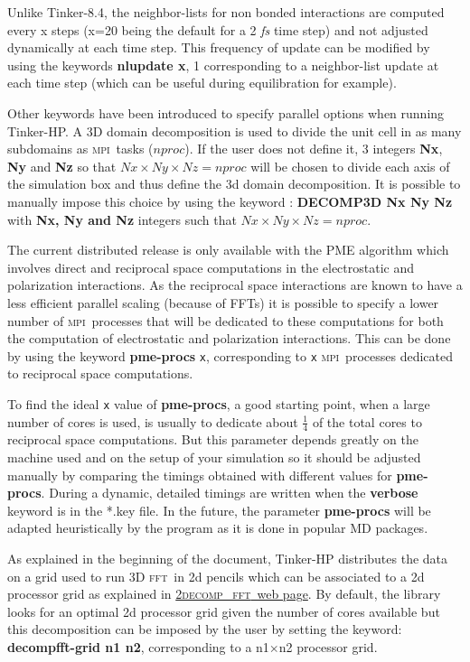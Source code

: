 \documentclass[peerreview]{IEEEtran}
\def\fft{\textsc{fft}}
\def\mpi{\textsc{mpi}}
\def\decomp{\textsc{2decomp\_fft}}
\begin{document}
\vskip5mm
Unlike Tinker-8.4, the neighbor-lists for non bonded interactions are computed every x steps (x=20 being the default for a 2 {\em fs} time step) and not adjusted dynamically at each time step. This frequency of update can be modified by using the keywords \textbf{nlupdate x}, 1 corresponding to a neighbor-list update at each time step (which can be useful during equilibration for example).

\vskip5mm
Other keywords have been introduced to specify parallel options when running Tinker-HP.
A 3D domain decomposition is used to divide the unit cell in as many subdomains as \mpi\ tasks ($nproc$). If the user does not define it, 3 integers \textbf{Nx}, \textbf{Ny} and \textbf{Nz} so that $Nx\times Ny\times Nz = nproc$ will be chosen to divide each axis of the simulation box and thus define the 3d domain decomposition. 
It is possible to manually impose this choice by using the keyword : \textbf{DECOMP3D Nx Ny Nz} with \textbf{Nx, Ny and Nz} integers such that $Nx\times Ny\times Nz = nproc$.


The current distributed release is only available with the PME algorithm which involves direct and reciprocal space computations in the electrostatic and polarization interactions. As the reciprocal space interactions are known to have a less efficient parallel scaling (because of FFTs) it is possible to specify a lower number of \mpi\  processes that will be dedicated to these computations for both the computation of electrostatic and polarization interactions. This can be done by using the keyword \textbf{pme-procs} \texttt{x}, corresponding to \texttt{x} \mpi\  processes dedicated to reciprocal space computations.

\vskip5mm
To find the ideal \texttt{x} value of \textbf{pme-procs}, a good starting point, when a large number of cores is used, is usually to dedicate about $\frac{1}{4}$ of the total cores to reciprocal space computations. But this parameter depends greatly on the machine used and on the setup of your simulation so it should be adjusted manually by comparing the timings obtained with different values for \textbf{pme-procs}. During a dynamic, detailed timings are written when the \textbf{verbose} keyword is in the *.key file. In the future, the parameter \textbf{pme-procs} will be adapted heuristically by the program as it is done in popular MD packages.

\vskip5mm
As explained in the beginning of the document, Tinker-HP distributes the data on a grid used to run 3D \fft\  in 2d pencils which can be associated to a 2d processor grid as explained in \href{http://www.2decomp.org/decomp.html}{\decomp\ web page}. By default, the library looks for an optimal 2d processor grid given the number of cores available but this decomposition can be imposed by the user by setting the keyword: \textbf{decompfft-grid n1 n2}, corresponding to a n1$\times$n2 processor grid.
\end{document}
